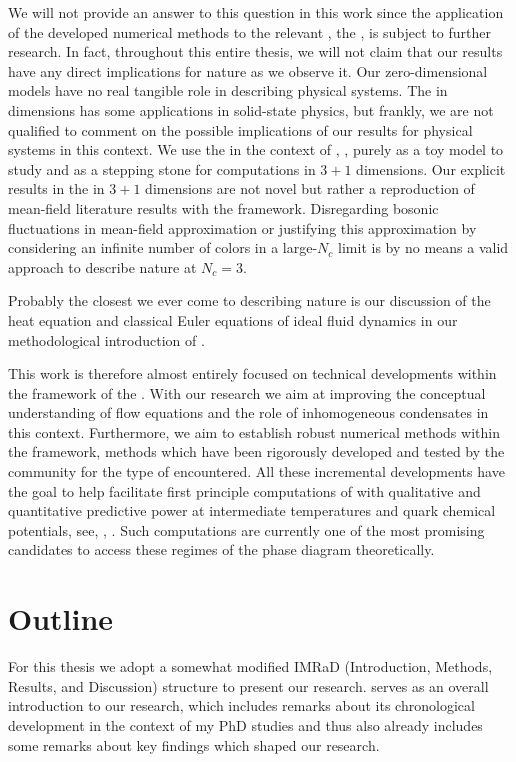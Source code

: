 We will not provide an answer to this question in this work since the application of the developed numerical methods to the relevant \loeft{}, \viz{} the \qmm{}, is subject to further research.
In fact, throughout this entire thesis, we will not claim that our results have any direct implications for nature as we observe it.
Our zero-dimensional models have no real tangible role in describing physical systems.
The \gnm{} in  dimensions has some applications in solid-state physics, but frankly, we are not qualified to comment on the possible implications of our results for physical systems in this context.
We use the \gnm{} in the context of \hep{}, \ie{}, purely as a toy model to study \csb{} and as a stepping stone for computations in $3+1$ dimensions.
Our explicit results in the \qmm{} in  $3+1$ dimensions are not novel but rather a reproduction of mean-field literature results with the \frg{} framework. 
Disregarding bosonic fluctuations in mean-field approximation or justifying this approximation by considering an infinite number of colors in a large-$N_c$ limit is \apriori{} by no means a valid approach to describe nature at $N_c=3$.

Probably the closest we ever come to describing nature is our discussion of the heat equation and classical Euler equations of ideal fluid dynamics in our methodological introduction of \cfd{}.\bigskip

This work is therefore almost entirely focused on technical developments within the framework of the \frg{}.
With our research we aim at improving the conceptual understanding of \frg{} flow equations and the role of inhomogeneous condensates in this context.
Furthermore, we aim to establish robust numerical methods within the \frg{} framework, methods which have been rigorously developed and tested by the \cfd{} community for the type of \pdes{} encountered.
All these incremental developments have the goal to help facilitate first principle \frg{} computations of \qcd{} with qualitative and quantitative predictive power at intermediate temperatures and quark chemical potentials, see, \eg{}, .
Such computations are currently one of the most promising candidates to access these regimes of the phase diagram theoretically.

\section{Outline}\label{sec:outline}
For this thesis we adopt a somewhat modified IMRaD (Introduction, Methods, Results, and Discussion) structure to present our research.
 serves as an overall introduction to our research, which includes remarks about its chronological development in the context of my PhD studies and thus also already includes some remarks about key findings which shaped our research.\bigskip


